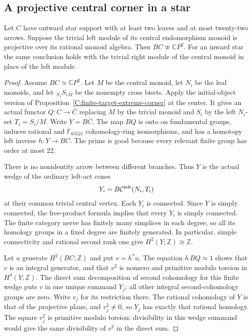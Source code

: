 \subsection{A projective central corner in a star}

\begin{theorem}\label{C:star-projective-center22}
Let $C$ have outward star support with at least two leaves and
at most twenty-two arrows. Suppose the trivial left module of
its central endomorphism monoid is projective over its rational
monoid algebra. Then $BC\not\simeq\mathbb CP^2$.
For an inward star the same conclusion holds with the trivial
right module of the central monoid in place of the left module.
\end{theorem}
\begin{proof}
Assume $BC\simeq\mathbb CP^2$. Let $M$ be the central monoid,
let $N_i$ be the leaf monoids, and let ${}_{N_i}S_i{}_M$ be
the nonempty cross bisets. Apply the initial-object version
of Proposition~\ref{C:finite-target-extreme-corner} at the center.
It gives an actual functor $Q:C\to\bar C$ replacing $M$ by
the trivial monoid and $S_i$ by the left $N_i$-set
$T_i=S_i/M$. Write $Y=B\bar C$.
The map $BQ$ is onto on fundamental groups, induces rational
and $\mathbb F_{65521}$ cohomology-ring isomorphisms, and has
a homotopy left inverse $h:Y\to BC$. The prime is good
because every relevant finite group has order at most $22$.

There is no nonidentity arrow between different branches.
Thus $Y$ is the actual wedge of the ordinary left-act cones
\[
 Y_i=B\mathcal C^{\rm left}(N_i,T_i)
\]
at their common trivial central vertex. Each $Y_i$ is connected.
Since $Y$ is simply connected, the free-product formula implies
that every $Y_i$ is simply connected. The finite category nerve
has finitely many simplices in each degree, so all its homology
groups in a fixed degree are finitely generated. In particular,
simple connectivity and rational second rank one give
$H^2(Y;\mathbb Z)\cong\mathbb Z$.

Let $u$ generate $H^2(BC;\mathbb Z)$ and put $v=h^*u$.
The equation $h\,BQ\simeq1$ shows that $v$ is an integral
generator, and that $v^2$ is nonzero and primitive modulo
torsion in $H^4(Y;\mathbb Z)$. The direct sum decomposition
of second cohomology for this finite wedge puts $v$ in one
unique summand $Y_j$; all other integral second-cohomology
groups are zero. Write $v_j$ for its restriction there.
The rational cohomology of $Y$ is that of the projective plane,
and $v_j^2\ne0$, so $Y_j$ has exactly that rational homology.
The square $v_j^2$ is primitive modulo torsion: divisibility
in this wedge summand would give the same divisibility of
$v^2$ in the direct sum.


\end{proof}
